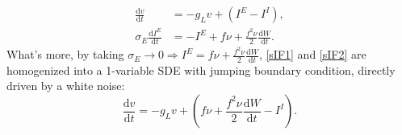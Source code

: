 \documentclass[10pt]{article}
\begin{document}
\begin{multicols}{2}
\begin{subequations}
\begin{align}
    \frac{\mbox{d}v}{\mbox{d}t} &=  - g_Lv+(I^{E}-I^I), \label{sIF1} \\ 
    \sigma_E\frac{\mbox{d}I^{E}}{\mbox{d}t} &= -I^E+f\nu+\frac{f^2\nu}{2}\frac{\mbox{d}W}{\mbox{d}t}.\label{sIF2}
\end{align}
\end{subequations}
What's more, by taking $\sigma_E\to0\Rightarrow I^E = f\nu+\frac{f^2\nu}{2}\frac{\mbox{d}W}{\mbox{d}t}$, \ref{sIF1} and \ref{sIF2} are homogenized into a 1-variable SDE with jumping boundary condition, directly driven by a white noise:
\indent
\begin{equation}
\frac{\mbox{d}v}{\mbox{d}t} =  - g_Lv+(f\nu+\frac{f^2\nu}{2}\frac{\mbox{d}W}{\mbox{d}t}-I^I). \label{sIF}
\end{equation}


\end{multicols}
\end{document}
